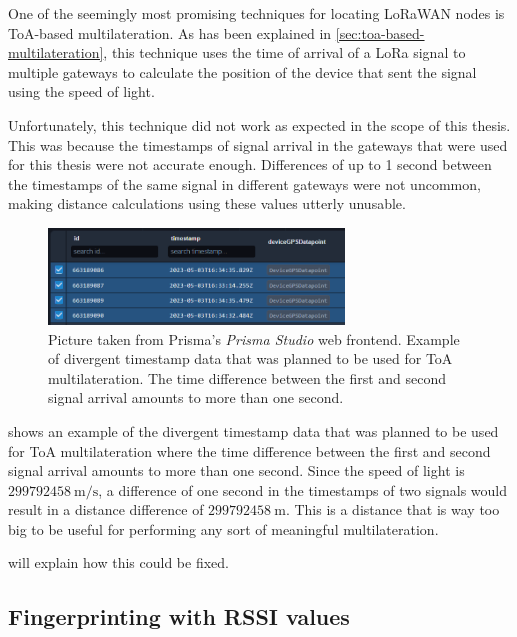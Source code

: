 One of the seemingly most promising techniques for locating \ac{LoRaWAN} nodes is \ac{ToA}-based multilateration.
As has been explained in \cref{sec:toa-based-multilateration}, this technique uses the time of arrival of a \ac{LoRa} signal to multiple gateways to calculate the position of the device that sent the signal using the speed of light.

Unfortunately, this technique did not work as expected in the scope of this thesis.
This was because the timestamps of signal arrival in the gateways that were used for this thesis were not accurate enough.
Differences of up to 1 second between the timestamps of the same signal in different gateways were not uncommon, making distance calculations using these values utterly unusable.

\begin{figure}[htbp]
    \centering
    \includegraphics[width=0.7\textwidth]{pictures/multilateration/toa_bad_data_example_prisma_studio.png}
    \caption{
        Picture taken from Prisma's \emph{Prisma Studio} web frontend.
        Example of divergent timestamp data that was planned to be used for \ac{ToA} multilateration.
        The time difference between the first and second signal arrival amounts to more than one second.
    }\label{fig:toa-bad-data-example}
\end{figure}

 shows an example of the divergent timestamp data that was planned to be used for \ac{ToA} multilateration where the time difference between the first and second signal arrival amounts to more than one second.
Since the speed of light is $299792458\ \mathrm{m/s}$, a difference of one second in the timestamps of two signals would result in a distance difference of $299792458\ \mathrm{m}$.
This is a distance that is way too big to be useful for performing any sort of meaningful multilateration.

 will explain how this could be fixed.

\subsection{Fingerprinting with \acs{RSSI} values}\label{sec:fingerprinting-with-rssi-values}

